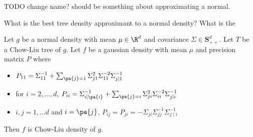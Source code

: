 
TODO change name?
should be something about approximating a normal.

What is the best tree density approximant to a normal density?
What is the


\begin{prop}


Let $g$ be a normal density with mean $\mu \in \R^d$ and covariance $\Sigma \in \mathbf{S}^d_{++}$.
Let $T$ be a Chow-Liu tree of $g$.
Let $f$ be a gaussian density with mean $\mu$ and precision matrix $P$ where
  \begin{itemize}
    \item $P_{11} = \Sigma_{11}^{-1} + \sum_{\pa{j} = 1}
\Sigma_{j1}^2\Sigma_{11}^{-2}\Sigma_{j\mid 1}^{-1}$
      \item for $i = 2, \dots, d$, $P_{ii} = \Sigma_{i\mid\pa{i}}^{-1} + \sum_{\pa{j} = i} \Sigma_{ji}^2\Sigma_{ii}^{-2}\Sigma_{j\mid i}^{-1}$
      \item $i, j = 1, \dots d$ and $i = \pa{j}$, $P_{ij} = P_{ji} = -\Sigma_{ji}\Sigma_{jj}^{-1}\Sigma_{j \mid i}^{-1}$
  \end{itemize}
  Then $f$ is Chow-Liu density of $g$.
\end{prop}
